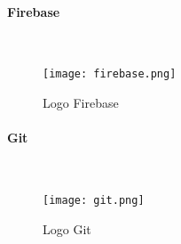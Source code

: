 \paragraph{Firebase} \mbox{} \\
\vspace{1cm}
\begin{figure}[H]
    \centering
    \texttt{[image: firebase.png]}
    \vspace{1cm}
    \caption{Logo Firebase}
    \label{fig:firebase_logo}
\end{figure}
\paragraph{Git} \mbox{} \\
\vspace{1cm}
\begin{figure}[H]
    \centering
    \texttt{[image: git.png]}
    \vspace{1cm}
    \caption{Logo Git}
    \label{fig:git_logo}
\end{figure}

